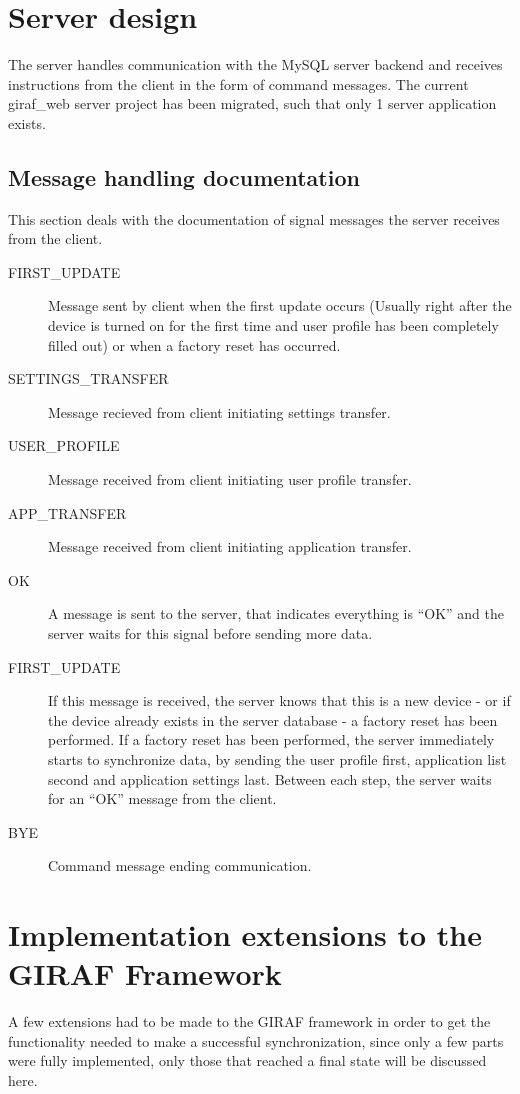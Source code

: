 \section{Server design}
The server handles communication with the MySQL server backend and receives instructions from the client in the form of command messages. The current giraf\_web server project has been migrated, such that only 1 server application exists. 

\subsection{Message handling documentation}
This section deals with the documentation of signal messages the server receives from the client.  

\begin{description}
	\item[FIRST\_UPDATE] Message sent by client when the first update occurs (Usually right after the device is turned on for the first time and user profile has been completely filled out) or when a factory reset has occurred.
	\item[SETTINGS\_TRANSFER] Message recieved from client initiating settings transfer.
	\item[USER\_PROFILE] Message received from client initiating user profile transfer.
	\item[APP\_TRANSFER] Message received from client initiating application transfer.
	\item[OK] A message is sent to the server, that indicates everything is ``OK'' and the server waits for this signal before sending more data.
	\item[FIRST\_UPDATE] If this message is received, the server knows that this is a new device - or if the device already exists in the server database - a factory reset has been performed.
If a factory reset has been performed, the server immediately starts to synchronize data, by sending the user profile first, application list second and application settings last. Between each step, the server waits for an ``OK'' message from the client. 
	\item[BYE] Command message ending communication. 
\end{description}

\section{Implementation extensions to the GIRAF Framework}
A few extensions had to be made to the GIRAF framework in order to get the functionality needed to make a successful synchronization, since only a few parts were fully implemented, only those that reached a final state will be discussed here. 

